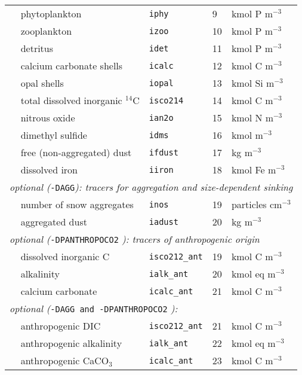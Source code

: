 \documentclass[11pt,a4paper,fleqn,twoside]{article}
\def\ntwoo{\text{\textsc{n$_2$o}}\,}
\def\cariso{\text{\textsc{c$_T^{14}$}}\,}
\def\dms{\text{\textsc{dms}}\,}
\def\Acar{\text{\textsc{c$_T^A$}}\,}
\def\Aalk{\text{\textsc{a$_T^A$}}\,}
\def\Acal{\text{\textsc{caco$_3^A$}}\,}
\def\phy{\text{\textsc{phy}}\,}
\def\zoo{\text{\textsc{zoo}}\,}
\def\det{\text{\textsc{det}}\,}
\def\opal{\text{\textsc{opal}}\,}
\def\cal{\text{\textsc{caco$_3$}}\,}
\def\nos{\text{\textsc{nos}}\,}
\def\adust{\text{\textsc{adust}}\,}
\def\fe{\text{\textsc{fe}}\,}
\def\fdust{\text{\textsc{fdust}}\,}
\def\dms{\text{\textsc{dms}}\,}
\newcommand{\concP}{kmol P m$^{-3}$\,}
\newcommand{\concN}{kmol N m$^{-3}$\,}
\newcommand{\concC}{kmol C m$^{-3}$\,}
\newcommand{\concSi}{kmol Si m$^{-3}$\,}
\newcommand{\concn}{particles cm$^{-3}$\,}
\newcommand{\concalk}{kmol eq m$^{-3}$\,}
\newcommand{\concdust}{kg m$^{-3}$\,}
\newcommand{\concFe}{kmol Fe m$^{-3}$\,}
\newcommand{\concDMS}{kmol m$^{-3}$\,}
\begin{document}
\begin{table}[hbt]
\begin{center}
\begin{tabular}{lllll}
\phy & phytoplankton    & {\tt iphy}    & 9     &\concP\\
\zoo & zooplankton      & {\tt izoo}    &10     &\concP\\
\det & detritus         & {\tt idet}    &11     &\concP\\
\cal & calcium carbonate shells         & {\tt icalc}   &12     &\concC\\
\opal& opal shells            & {\tt iopal}   &13     &\concSi\\ 
\cariso& total dissolved inorganic $^{14}$C   & {\tt isco214}   &14 &\concC\\ 
\ntwoo& nitrous oxide  & {\tt ian2o}   &15     &\concN\\ 
\dms& dimethyl sulfide             & {\tt idms}   &16     &\concDMS\\ 
\fdust& free (non-aggregated) dust & {\tt ifdust}   &17     &\concdust\\ 
\fe  & dissolved iron & {\tt iiron}   &18     &\concFe\\ 

\multicolumn{5}{l}{\rule{0mm}{4mm}{\it optional (}{\tt -DAGG}{\it ): tracers for
aggregation and size-dependent sinking}}\\ \hline
\nos & number of snow aggregates& {\tt inos}    &19     &\concn\\ 
\adust & aggregated dust& {\tt iadust}    &20     &\concdust\\ 

\multicolumn{5}{l}{\rule{0mm}{4mm}{\it optional (}{\tt -DPANTHROPOCO2}{\it
): tracers of anthropogenic origin}}\\ \hline
\Acar & dissolved inorganic C& {\tt isco212\_ant}    & 19   &\concC\\ 
\Aalk & alkalinity& {\tt ialk\_ant}    &20     &\concalk\\ 
\Acal& calcium carbonate & {\tt icalc\_ant}   &21     &\concC\\ 

\multicolumn{5}{l}{\rule{0mm}{4mm}{\it optional (}{\tt -DAGG and -DPANTHROPOCO2}
{\it ):}}\\ \hline
\Acar & anthropogenic DIC& {\tt isco212\_ant}    & 21   &\concC\\ 
\Aalk & anthropogenic alkalinity& {\tt ialk\_ant}    &22     &\concalk\\ 
\Acal& anthropogenic CaCO$_3$ & {\tt icalc\_ant}   &23     &\concC\\ \hline

\end{tabular}
\end{center}
\end{table}
\end{document}
